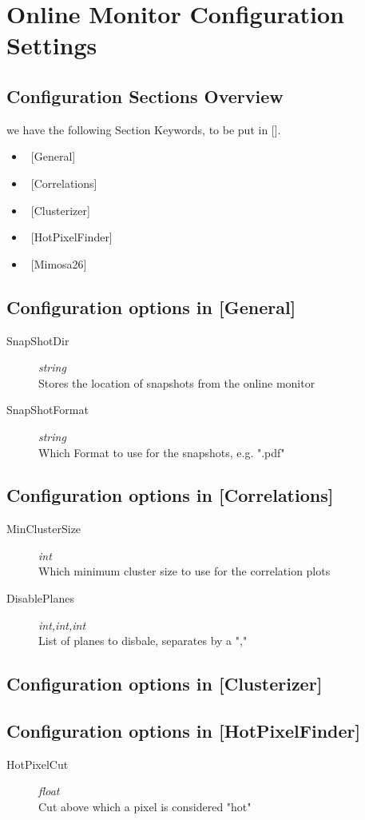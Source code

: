 \section{Online Monitor Configuration Settings}
\subsection{Configuration Sections Overview}
we have the following Section Keywords, to be put in [].
\begin{itemize}
\item  ~[General]
\item ~[Correlations]
\item ~[Clusterizer]
\item ~[HotPixelFinder]
\item ~[Mimosa26]
\end{itemize}
\subsection{Configuration options in [General]} 
\begin{description}
\item[SnapShotDir] {\it string} \\Stores the location of snapshots from the online monitor
\item[SnapShotFormat] {\it string}\\ Which Format to use for the snapshots, e.g. ".pdf"
\end{description}
\subsection{Configuration options in [Correlations]}
\begin{description}
\item[MinClusterSize] {\it int} \\
Which minimum cluster size to use for the correlation plots  
\item[DisablePlanes] {\it int,int,int} \\
List of planes to disbale, separates by a ","
\end{description}
\subsection{Configuration options in [Clusterizer]}
\subsection{Configuration options in [HotPixelFinder]}
\begin{description}
\item[HotPixelCut] {\it float} \\ Cut above which a pixel is considered "hot"
\end{description}
